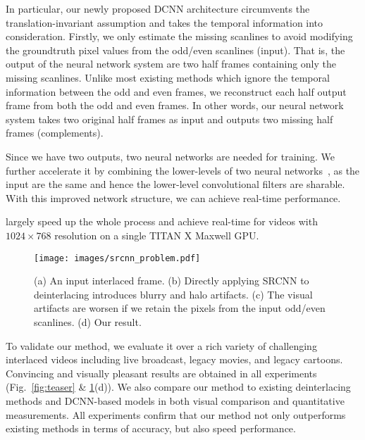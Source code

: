 
In particular, our newly proposed DCNN architecture circumvents the translation-invariant assumption and takes the temporal
information into consideration. Firstly, we only estimate the missing scanlines
to avoid modifying the groundtruth pixel values from the odd/even scanlines
(input). That is, the output of the neural network system are two half frames
containing only the missing scanlines. Unlike most existing methods which ignore the
temporal information between the odd and even frames, we reconstruct each half 
output frame from both the odd and even frames. In other words,
 our
neural network system takes two original half frames as input and outputs two missing half
frames (complements). 

Since we have two outputs, two neural networks are needed for training. 
We further accelerate it by combining the lower-levels of two
neural networks~\cite{bengio2012deep}, as the input are the same and 
hence the lower-level convolutional filters are sharable. 
With this improved network structure, we can achieve real-time performance.

largely speed up the whole process and achieve real-time for videos with
$1024\times768$ resolution on a single TITAN X Maxwell GPU. 
\fi 

\begin{figure}[!tp]
\texttt{[image: images/srcnn\_problem.pdf]}\\
\caption{(a) An input interlaced frame. 
(b) Directly applying SRCNN to deinterlacing introduces blurry and halo artifacts. 
(c) The visual artifacts are worsen if we retain the pixels from the input odd/even scanlines. 
(d) Our result.}\label{fig:srcnn_problem} 
\end{figure}

To validate our method, we evaluate it over a rich
variety of challenging interlaced videos including live broadcast, legacy movies,
and legacy cartoons. Convincing and visually pleasant results are obtained in all experiments 
(Fig.~\ref{fig:teaser} \& \ref{fig:srcnn_problem}(d)). We also compare our
method to existing deinterlacing methods and DCNN-based models in both visual comparison and quantitative
measurements. All experiments confirm that our method not
only outperforms existing methods in terms of accuracy, but also
speed performance. 



